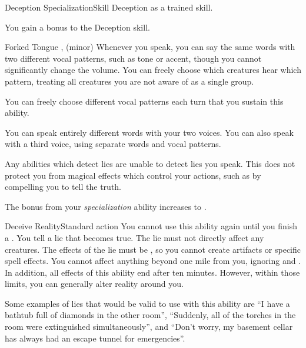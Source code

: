   \begin{feat}{Deception Specialization}{Skill}
    \featpre Deception as a trained skill.

     You gain a  bonus to the Deception skill.

    \begin{sustainability}{Forked Tongue}{}
      \abilitytags {},  (minor)
      \rankline
      Whenever you speak, you can say the same words with two different vocal patterns, such as tone or accent, though you cannot significantly change the volume.
      You can freely choose which creatures hear which pattern, treating all creatures you are not aware of as a single group.

      You can freely choose different vocal patterns each turn that you sustain this ability.

      \rankline
       You can speak entirely different words with your two voices.
       You can also speak with a third voice, using separate words and vocal patterns.
    \end{sustainability}

     Any \magical abilities which detect lies are unable to detect lies you speak.
    This does not protect you from magical effects which control your actions, such as by compelling you to tell the truth.

     The bonus from your \textit{specialization} ability increases to .

    \begin{magicalactiveability}{Deceive Reality}{Standard action}
      \abilitycost You cannot use this ability again until you finish a .
      \rankline
      You tell a lie that becomes true.
      The lie must not directly affect any creatures.
      The effects of the lie must be , so you cannot create artifacts or specific spell effects.
      You cannot affect anything beyond one mile from you, ignoring  and .
      In addition, all effects of this ability end after ten minutes.
      However, within those limits, you can generally alter reality around you.

      Some examples of lies that would be valid to use with this ability are ``I have a bathtub full of diamonds in the other room'', ``Suddenly, all of the torches in the room were extinguished simultaneously'', and ``Don't worry, my basement cellar has always had an escape tunnel for emergencies''.
    \end{magicalactiveability}
  \end{feat}

